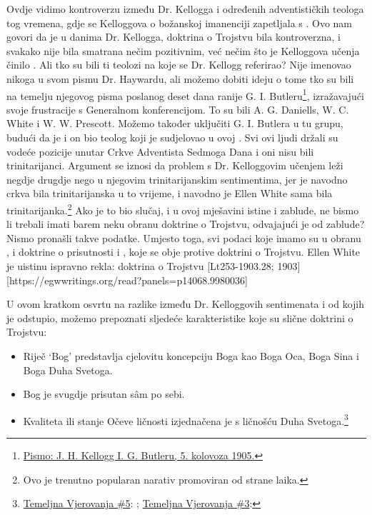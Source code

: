 Ovdje vidimo kontroverzu između Dr. Kellogga i određenih adventističkih teologa tog vremena, gdje se Kelloggova  o božanskoj imanenciji zapetljala s . Ovo nam govori da je u danima Dr. Kellogga, doktrina o Trojstvu bila kontroverzna, i svakako nije bila smatrana nečim pozitivnim, već nečim što je Kelloggova učenja činilo . Ali tko su bili ti teolozi na koje se Dr. Kellogg referirao? Nije imenovao nikoga u svom pismu Dr. Haywardu, ali možemo dobiti ideju o tome tko su bili  na temelju njegovog pisma poslanog deset dana ranije G. I. Butleru\footnote{\href{https://forgotten-pillar.s3.us-east-2.amazonaws.com/1905-08-05-kellogg-butler.pdf}{Pismo: J. H. Kellogg I. G. Butleru, 5. kolovoza 1905.}}, izražavajući svoje frustracije s Generalnom konferencijom. To su bili A. G. Daniells, W. C. White i W. W. Prescott. Možemo također uključiti G. I. Butlera u tu grupu, budući da je i on bio teolog koji je sudjelovao u ovoj . Svi ovi ljudi držali su vodeće pozicije unutar Crkve Adventista Sedmoga Dana i oni nisu bili trinitarijanci. Argument se iznosi da problem s Dr. Kelloggovim učenjem leži negdje drugdje nego u njegovim trinitarijanskim sentimentima, jer je navodno crkva bila trinitarijanska u to vrijeme, i navodno je Ellen White sama bila trinitarijanka.\footnote{Ovo je trenutno popularan narativ promoviran od strane laika.} Ako je to bio slučaj, i u ovoj mješavini istine i zablude, ne bismo li trebali imati barem neku obranu doktrine o Trojstvu, odvajajući je od zablude? Nismo pronašli takve podatke. Umjesto toga, svi podaci koje imamo su u obranu , i doktrine o prisutnosti i , koje se obje protive doktrini o Trojstvu. Ellen White je uistinu ispravno rekla: doktrina o Trojstvu [Lt253-1903.28; 1903][https://egwwritings.org/read?panels=p14068.9980036]

U ovom kratkom osvrtu na razlike između Dr. Kelloggovih sentimenata i  od kojih je odstupio, možemo prepoznati sljedeće karakteristike koje su slične doktrini o Trojstvu:

\begin{itemize}
    \item Riječ ‘Bog’ predstavlja cjelovitu koncepciju Boga kao Boga Oca, Boga Sina i Boga Duha Svetoga.
    \item Bog je svugdje prisutan sâm po sebi.
    \item Kvaliteta ili stanje Očeve ličnosti izjednačena je s ličnošću Duha Svetoga.\footnote{\href{https://www.adventist.org/wp-content/uploads/2020/06/ADV-28Beliefs2020.pdf}{Temeljna Vjerovanja \#5}: ; \href{https://www.adventist.org/wp-content/uploads/2020/06/ADV-28Beliefs2020.pdf}{Temeljna Vjerovanja \#3}: }
\end{itemize}

